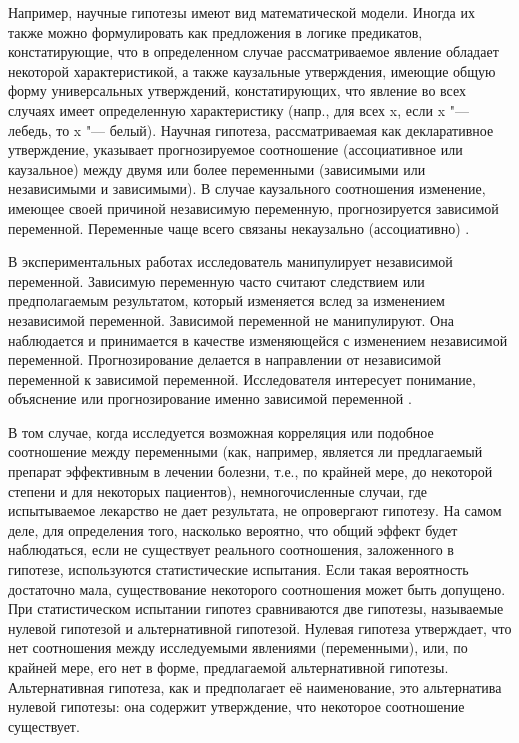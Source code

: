 Например, научные гипотезы имеют вид математической модели. Иногда их также можно формулировать как предложения в 
логике предикатов, констатирующие, что в определенном случае рассматриваемое явление обладает некоторой 
характеристикой, а также каузальные утверждения, имеющие общую форму универсальных утверждений, 
констатирующих, что явление во всех случаях имеет определенную характеристику (напр., для всех x, если 
x "--- лебедь, то x "--- белый). Научная гипотеза, рассматриваемая как декларативное утверждение, указывает 
прогнозируемое соотношение (ассоциативное или каузальное) между двумя или более переменными (зависимыми или 
независимыми и зависимыми). В случае каузального соотношения изменение, имеющее своей причиной независимую переменную, 
прогнозируется зависимой переменной. Переменные чаще всего связаны некаузально (ассоциативно) \cite{Haber2009}.

В экспериментальных работах исследователь манипулирует независимой переменной. Зависимую переменную часто считают 
следствием или предполагаемым результатом, который изменяется вслед за изменением независимой переменной. Зависимой 
переменной не манипулируют. Она наблюдается и принимается в качестве изменяющейся с изменением независимой переменной. 
Прогнозирование делается в направлении от независимой переменной к зависимой переменной. Исследователя интересует 
понимание, объяснение или прогнозирование именно зависимой переменной \cite{Haber2009}.

В том случае, когда исследуется возможная корреляция или подобное соотношение между переменными (как, например, 
является ли предлагаемый препарат эффективным в лечении болезни, т.е., по крайней мере, до некоторой степени и для 
некоторых пациентов), немногочисленные случаи, где испытываемое лекарство не дает результата, не опровергают гипотезу. 
На самом деле, для определения того, насколько вероятно, что общий эффект будет наблюдаться, если не существует 
реального соотношения, заложенного в гипотезе, используются статистические испытания. Если такая вероятность достаточно 
мала, существование некоторого соотношения может быть допущено. При статистическом испытании гипотез сравниваются две 
гипотезы, называемые нулевой гипотезой и альтернативной гипотезой. Нулевая гипотеза утверждает, что нет соотношения 
между исследуемыми явлениями (переменными), или, по крайней мере, его нет в форме, предлагаемой альтернативной 
гипотезы. Альтернативная гипотеза, как и предполагает её наименование, это альтернатива нулевой гипотезы: она содержит 
утверждение, что некоторое соотношение существует.

